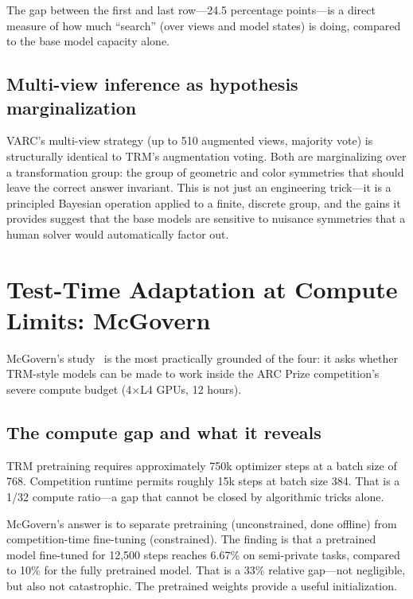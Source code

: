 \documentclass[11pt, letterpaper]{article}
\begin{document}
The gap between the first and last row---24.5 percentage points---is a
direct measure of how much ``search'' (over views and model states) is
doing, compared to the base model capacity alone.

\subsection{Multi-view inference as hypothesis marginalization}

VARC's multi-view strategy (up to 510 augmented views, majority vote) is
structurally identical to TRM's augmentation voting. Both are marginalizing
over a transformation group: the group of geometric and color symmetries
that should leave the correct answer invariant. This is not just an
engineering trick---it is a principled Bayesian operation applied to a
finite, discrete group, and the gains it provides suggest that the base
models are sensitive to nuisance symmetries that a human solver would
automatically factor out.

\section{Test-Time Adaptation at Compute Limits: McGovern}
\label{sec:mcgovern}

McGovern's study~\cite{mcgovern2025ttatrm} is the most practically grounded
of the four: it asks whether TRM-style models can be made to work inside the
ARC Prize competition's severe compute budget (4$\times$L4 GPUs, 12 hours).

\subsection{The compute gap and what it reveals}

TRM pretraining requires approximately 750k optimizer steps at a batch size
of 768. Competition runtime permits roughly 15k steps at batch size 384.
That is a 1/32 compute ratio---a gap that cannot be closed by algorithmic
tricks alone.

McGovern's answer is to separate pretraining (unconstrained, done offline)
from competition-time fine-tuning (constrained). The finding is that a
pretrained model fine-tuned for 12,500 steps reaches 6.67\% on semi-private
tasks, compared to 10\% for the fully pretrained model. That is a 33\%
relative gap---not negligible, but also not catastrophic. The pretrained
weights provide a useful initialization.
\end{document}
